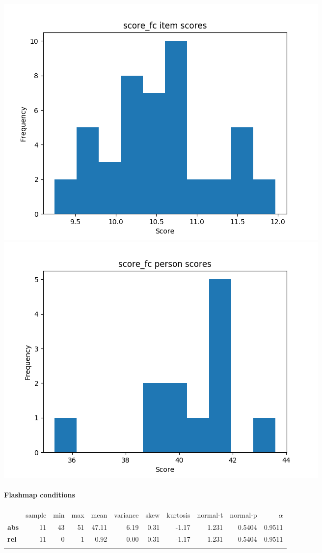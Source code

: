 \documentclass[]{article}
\begin{document}
\includegraphics{score_fc_diff.png} \includegraphics{score_fc_abil.png}

\FloatBarrier
\paragraph{Flashmap conditions}\label{flashmap-conditions-1}

\begin{longtable}[c]{@{}lrrrrrrrrrr@{}}
\toprule\addlinespace
& sample & min & max & mean & variance & skew & kurtosis & normal-t &
normal-p & $\alpha$
\\\addlinespace
\midrule\endhead
\textbf{abs} & 11 & 43 & 51 & 47.11 & 6.19 & 0.31 & -1.17 & 1.231 &
0.5404 & 0.9511
\\\addlinespace
\textbf{rel} & 11 & 0 & 1 & 0.92 & 0.00 & 0.31 & -1.17 & 1.231 & 0.5404
& 0.9511
\\\addlinespace
\bottomrule
\end{longtable}
\end{document}
